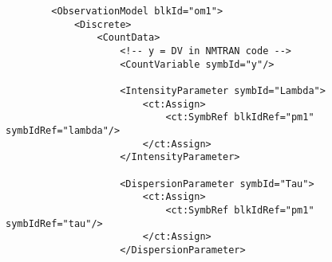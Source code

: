 \lstset{language=XML}
\begin{lstlisting}
        <ObservationModel blkId="om1">
            <Discrete>
                <CountData>
                    <!-- y = DV in NMTRAN code -->
                    <CountVariable symbId="y"/>
                    
                    <IntensityParameter symbId="Lambda">
                        <ct:Assign>
                            <ct:SymbRef blkIdRef="pm1" symbIdRef="lambda"/>
                        </ct:Assign>
                    </IntensityParameter>
                    
                    <DispersionParameter symbId="Tau">
                        <ct:Assign>
                            <ct:SymbRef blkIdRef="pm1" symbIdRef="tau"/>
                        </ct:Assign>
                    </DispersionParameter>
                    

\end{lstlisting}
